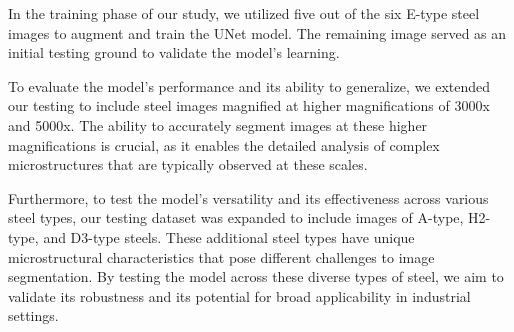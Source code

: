 \documentclass[]{article}
\begin{document}
In the training phase of our study, we utilized five out of the six E-type steel images to augment and train the UNet model. The remaining image served as an initial testing ground to validate the model's learning.

To evaluate the model's performance and its ability to generalize, we extended our testing to include steel images magnified at higher magnifications of 3000x and 5000x. The ability to accurately segment images at these higher magnifications is crucial, as it enables the detailed analysis of complex microstructures that are typically observed at these scales.

Furthermore, to test the model's versatility and its effectiveness across various steel types, our testing dataset was expanded to include images of A-type, H2-type, and D3-type steels. These additional steel types have unique microstructural characteristics that pose different challenges to image segmentation. By testing the model across these diverse types of steel, we aim to validate its robustness and its potential for broad applicability in industrial settings.
\end{document}
